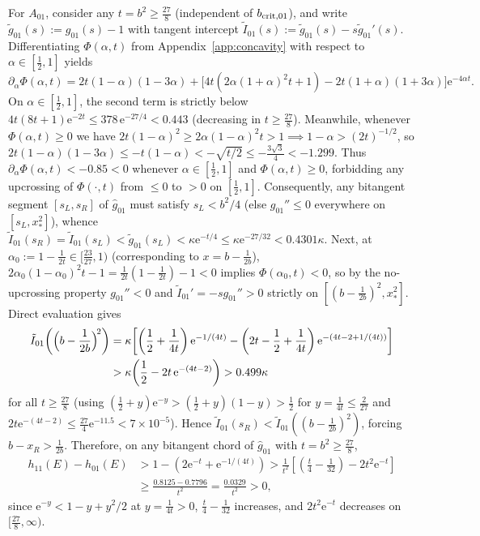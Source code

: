 \documentclass{iopjournal}
\newcommand{\ee}{\mathrm{e}}
\begin{document}
For $A_{01}$, consider any $t = b^2 \ge \frac{27}{8}$ (independent of $b_{\rm crit,01}$), and write $\tilde g_{01}(s) := g_{01}(s) - 1$ with tangent intercept $\tilde I_{01}(s) := \tilde g_{01}(s) - s \tilde g_{01}'(s)$. Differentiating $\Phi(\alpha,t)$ from Appendix~\ref{app:concavity} with respect to $\alpha \in [\frac{1}{2}, 1]$ yields
\begin{equation*}
\partial_\alpha \Phi(\alpha,t) = 2t(1-\alpha)(1-3\alpha) + \bigl[4t(2\alpha(1+\alpha)^2 t + 1) - 2t(1+\alpha)(1+3\alpha)\bigr]\ee^{-4\alpha t}.
\end{equation*}
On $\alpha \in [\frac{1}{2}, 1]$, the second term is strictly below $4t(8t+1)\ee^{-2t} \le 378\,\ee^{-27/4} < 0.443$ (decreasing in $t \ge \frac{27}{8}$). Meanwhile, whenever $\Phi(\alpha,t) \ge 0$ we have $2t(1-\alpha)^2 \ge 2\alpha(1-\alpha)^2 t > 1 \implies 1 - \alpha > (2t)^{-1/2}$, so $2t(1-\alpha)(1-3\alpha) \le -t(1-\alpha) < -\sqrt{t/2} \le -\frac{3\sqrt{3}}{4} < -1.299$. Thus $\partial_\alpha\Phi(\alpha,t) < -0.85 < 0$ whenever $\alpha \in [\frac{1}{2},1]$ and $\Phi(\alpha,t) \ge 0$, forbidding any upcrossing of $\Phi(\cdot,t)$ from $\le 0$ to $> 0$ on $[\frac{1}{2}, 1]$. Consequently, any bitangent segment $[s_L, s_R]$ of $\widehat{g}_{01}$ must satisfy $s_L < b^2/4$ (else $g_{01}'' \le 0$ everywhere on $[s_L, x_*^2]$), whence $\tilde I_{01}(s_R) = \tilde I_{01}(s_L) < \tilde g_{01}(s_L) < \kappa\ee^{-t/4} \le \kappa\ee^{-27/32} < 0.4301\kappa$. Next, at $\alpha_0 := 1 - \frac{1}{2t} \in [\frac{23}{27}, 1)$ (corresponding to $x = b - \frac{1}{2b}$), $2\alpha_0(1-\alpha_0)^2 t - 1 = \frac{1}{2t}(1 - \frac{1}{2t}) - 1 < 0$ implies $\Phi(\alpha_0,t) < 0$, so by the no-upcrossing property $g_{01}'' < 0$ and $\tilde I_{01}' = -s g_{01}'' > 0$ strictly on $[(b - \frac{1}{2b})^2, x_*^2]$. Direct evaluation gives
\begin{align*}
\tilde I_{01}\!\left(\Bigl(b - \frac{1}{2b}\Bigr)^{\!2}\right)
&= \kappa\!\left[\left(\frac{1}{2}+\frac{1}{4t}\right)\ee^{-1/(4t)} - \left(2t - \frac{1}{2} + \frac{1}{4t}\right)\ee^{-(4t-2+1/(4t))}\right] \\
&> \kappa\!\left(\frac{1}{2} - 2t\,\ee^{-(4t-2)}\right) > 0.499\kappa
\end{align*}
for all $t \ge \frac{27}{8}$ (using $(\frac{1}{2}+y)\ee^{-y} > (\frac{1}{2}+y)(1-y) > \frac{1}{2}$ for $y = \frac{1}{4t} \le \frac{2}{27}$ and $2t\ee^{-(4t-2)} \le \frac{27}{4}\ee^{-11.5} < 7\times 10^{-5}$). Hence $\tilde I_{01}(s_R) < \tilde I_{01}((b - \frac{1}{2b})^2)$, forcing $b - x_R > \frac{1}{2b}$. Therefore, on any bitangent chord of $\widehat{g}_{01}$ with $t = b^2 \ge \frac{27}{8}$,
\begin{align*}
h_{11}(E) - h_{01}(E) &> 1 - (2\ee^{-t} + \ee^{-1/(4t)}) > \frac{1}{t^2}\!\left[\left(\frac{t}{4} - \frac{1}{32}\right) - 2t^2\ee^{-t}\right] \\
&\ge \frac{0.8125 - 0.7796}{t^2} = \frac{0.0329}{t^2} > 0,
\end{align*}
since $\ee^{-y} < 1 - y + y^2/2$ at $y = \frac{1}{4t} > 0$, $\frac{t}{4} - \frac{1}{32}$ increases, and $2t^2\ee^{-t}$ decreases on $[\frac{27}{8}, \infty)$.
\end{document}
